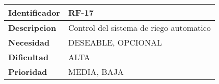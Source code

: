 \begin{center}
    \begin{tabular}{|p{2.6cm}|p{12cm}|}
    \hline
    \textbf{Identificador} & RF-17\\
    \hline
    \textbf{Descripcion} & Control del sistema de riego automatico\\
    \hline
    \textbf{Necesidad} & DESEABLE, OPCIONAL\\
    \hline
    \textbf{Dificultad} & ALTA\\
    \hline
    \textbf{Prioridad} & MEDIA, BAJA\\
    \hline
    \end{tabular}
\end{center}
